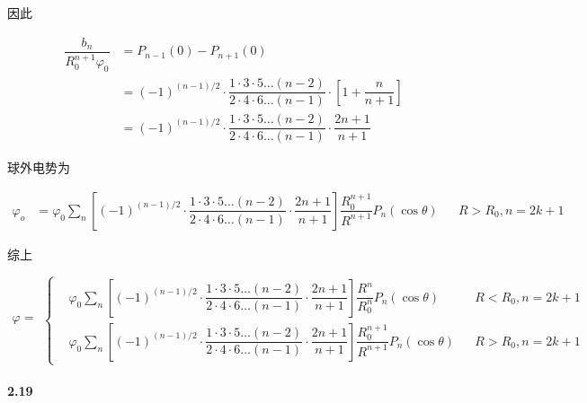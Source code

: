 \documentclass{article}
\begin{document}
因此

\begin{equation*}
  \begin{aligned}
    \dfrac{b_n}{R_0^{n+1} \varphi_0}  &=
    P_{n-1} \left( 0 \right) - P_{n+1} \left( 0 \right) \\
    &= \left( -1  \right)^{\left( n-1 \right)/ 2} \cdot \dfrac{1 \cdot 3 \cdot 5 \dots \left( n-2 \right)}{2 \cdot 4 \cdot 6 \dots \left( n-1 \right)} \cdot \left[ 1 + \dfrac{n}{n+1}  \right] \\
    &= \left( -1  \right)^{\left( n-1 \right)/ 2} \cdot \dfrac{1 \cdot 3 \cdot 5 \dots \left( n-2 \right)}{2 \cdot 4 \cdot 6 \dots \left( n-1 \right)} \cdot \dfrac{2n+1}{n+1}
  \end{aligned}
\end{equation*}

球外电势为

\begin{equation*}
  \begin{aligned}
    \varphi_o &= \varphi_0 \sum_n \left[ \left( -1  \right)^{\left( n-1 \right)/ 2} \cdot \dfrac{1 \cdot 3 \cdot 5 \dots \left( n-2 \right)}{2 \cdot 4 \cdot 6 \dots \left( n-1 \right)} \cdot \dfrac{2n+1}{n+1}
 \right] \dfrac{R_0^{n+1}}{R^{n+1}}  P_n \left( \cos \theta \right) && R>R_0, n=2k+1
  \end{aligned}
\end{equation*}

综上

\begin{equation*}
  \begin{aligned}
    \varphi = 
  \end{aligned}
  \left\{
  \begin{aligned}
    &\varphi_0 \sum_n \left[ \left( -1  \right)^{\left( n-1 \right)/ 2} \cdot \dfrac{1 \cdot 3 \cdot 5 \dots \left( n-2 \right)}{2 \cdot 4 \cdot 6 \dots \left( n-1 \right)} \cdot \dfrac{2n+1}{n+1}
 \right] \dfrac{R^n}{R_0^n}  P_n \left( \cos \theta \right) && R<R_0, n=2k+1 \\
    &\varphi_0 \sum_n \left[ \left( -1  \right)^{\left( n-1 \right)/ 2} \cdot \dfrac{1 \cdot 3 \cdot 5 \dots \left( n-2 \right)}{2 \cdot 4 \cdot 6 \dots \left( n-1 \right)} \cdot \dfrac{2n+1}{n+1}
 \right] \dfrac{R_0^{n+1}}{R^{n+1}}  P_n \left( \cos \theta \right) && R>R_0, n=2k+1
  \end{aligned}
  \right.
\end{equation*}

\paragraph{2.19}
\end{document}
